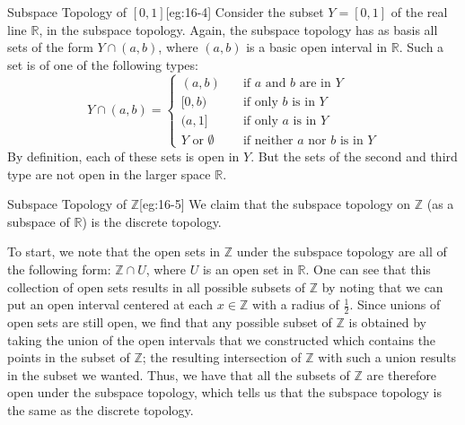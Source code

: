 \begin{egBox}{Subspace Topology of \( [ 0, 1 ] \)}[eg:16-4]
    Consider the subset \( Y = [ 0, 1 ] \) of the real line \( \mathbb{R} \),
    in the subspace topology.
    Again, the subspace topology has as basis all sets of the form 
    \( Y \cap ( a, b ) \), where \( ( a, b ) \) is a basic open interval in 
    \( \mathbb{R} \).
    Such a set is of one of the following types:
    \begin{equation*}
        Y \cap ( a, b )
        =
        \begin{cases} 
            ( a, b ) \quad & \text{if } a \text{ and } b \text{ are in } Y
            \\
            [ 0, b ) \quad & \text{if only } b \text{ is in } Y
            \\
            ( a, 1 ] \quad & \text{if only } a \text{ is in } Y
            \\
            Y \text{ or } \emptyset \quad & 
            \text{if neither } a \text{ nor } b \text{ is in } Y
        \end{cases}
    \end{equation*}
    By definition, each of these sets is open in \( Y \).
    But the sets of the second and third type are not open in the larger space
    \( \mathbb{R} \).
\end{egBox}

\begin{egBox}{Subspace Topology of \( \mathbb{Z} \)}[eg:16-5]
    We claim that the subspace topology on \( \mathbb{Z} \) (as a subspace of 
    \( \mathbb{R} \)) is the discrete topology.

    \baseSkip

    To start, we note that the open sets in \( \mathbb{Z} \) under the subspace
    topology are all of the following form: \( \mathbb{Z} \cap U \), where
    \( U \) is an open set in \( \mathbb{R} \).
    One can see that this collection of open sets results in all possible 
    subsets of \( \mathbb{Z} \) by noting that we can put an open interval
    centered at each \( x \in \mathbb{Z} \) with a radius of 
    \( \frac{ 1 }{ 2 } \). 
    Since unions of open sets are still open, we find that any possible 
    subset of \( \mathbb{Z} \) is obtained by taking the union of the open 
    intervals that we
    constructed which contains the points in the subset of \( \mathbb{Z} \);
    the resulting intersection of \( \mathbb{Z} \) with such a union results 
    in the subset we wanted.
    Thus, we have that all the subsets of \( \mathbb{Z} \) are therefore open
    under the subspace topology, which tells us that the subspace topology 
    is the same as the discrete topology.
\end{egBox}

